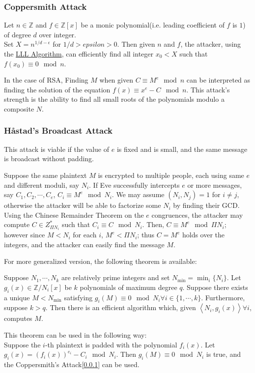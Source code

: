 \documentclass{report}
\begin{document}
			\subsubsection{Coppersmith Attack} \label{coppersmith-attack}
			\begin{thm}[Coppersmith]
				Let $n \in \mathbb{Z}$ and $f \in \mathbb{Z}[x]$ be a monic polynomial(i.e. leading coefficient of $f$ is $1$) of degree $d$ over integer.\\
				Set $X=n^{1/d-\epsilon}$ for $1/d>epsilon>0$.
				Then given $n$ and $f$, the attacker, using the \href{https://en.wikipedia.org/wiki/Lenstra\%E2\%80\%93Lenstra\%E2\%80\%93Lov\%C3\%A1sz_lattice_basis_reduction_algorithm}{LLL Algorithm}, can efficiently find all integer $x_0<X$ such that $f(x_0) \equiv 0 \mod n$.
			\end{thm}
			\begin{note}
				In the case of RSA, Finding $M$ when given $C \equiv M^e \mod n$ can be interpreted as finding the solution of the equation $f(x) \equiv x^e - C \mod n$. This attack's strength is the ability to find all small roots of the polynomials modulo a composite $N$.
			\end{note}
			
			\subsubsection{Håstad's Broadcast Attack}
			This attack is viable if the value of $e$ is fixed and is small, and the same message is broadcast without padding.
			
			Suppose the same plaintext $M$ is encrypted to multiple people, each using same $e$ and different moduli, say $N_i$. If Eve successfully intercepts $e$ or more messages, say $C_1,C_2,\cdots,C_e$, $C_i \equiv M^e \mod N_i$. We may assume $(N_i,N_j)=1$ for $i \ne j$, otherwise the attacker will be able to factorize some $N_i$ by finding their GCD. Using the Chinese Remainder Theorem on the $e$ congruences, the attacker may compute $C \in Z_{\Pi N_i}^*$ such that $C_i \equiv C \mod N_i$. Then, $C \equiv M^e \mod \Pi N_i$; however since $M<N_i$ for each $i$, $M^e<\Pi N_i$; thus $C=M^e$ holds over the integers, and the attacker can easily find the message $M$.
			
			For more generalized version, the following theorem is available:
			\begin{thm}[Håstad]
				Suppose $N_1,\cdots,N_k$ are relatively prime integers and set $N_{\min}=\min_i\{N_i\}$. Let $g_i(x) \in \mathbb{Z}/N_i[x]$ be $k$ polynomials of maximum degree $q$. Suppose there exists a unique $M<N_{\min}$ satisfying $g_i(M) \equiv 0 \mod N_i \forall i \in \{1,\cdots,k\}$. Furthermore, suppose $k>q$. Then there is an efficient algorithm which, given $\left< N_i,g_i(x)\right> \forall i$, computes $M$.
			\end{thm}
			This theorem can be used in the following way:\\
			Suppose the $i$-th plaintext is padded with the polynomial $f_i(x)$. Let $g_i(x)=(f_i(x))^{e_i}-C_i \mod N_i$. Then $g_i(M) \equiv 0 \mod N_i$ is true, and the Coppersmith's Attack[\ref{coppersmith-attack}] can be used.
			
\end{document}
